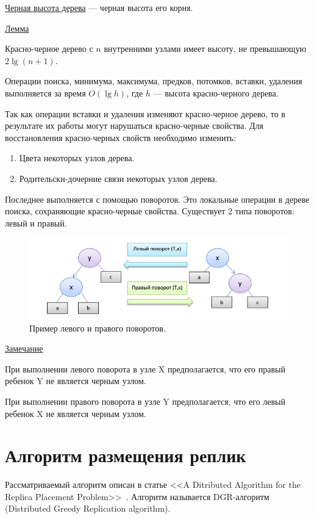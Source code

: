 		\underline{Черная высота дерева} --- черная высота его корня.

		\underline{Лемма}

		Красно-черное дерево с $n$ внутренними узлами имеет высоту, не превышающую 
		$2\lg(n+1)$.
	
		Операции поиска, минимума, максимума, предков, потомков, вставки, удаления выполняется 
		за время $O(\lg h)$, где $h$ --- высота красно-черного дерева.

		Так как операции вставки и удаления изменяют красно-черное дерево,
		то в результате их работы могут нарушаться красно-черные свойства. 
		Для восстановления красно-черных свойств необходимо изменить:
		\begin{enumerate}
			\item Цвета некоторых узлов дерева.
			\item Родительски-дочерние связи некоторых узлов дерева.
		\end{enumerate}
		
		Последнее выполняется с помощью поворотов. Это локальные операции в
		дереве поиска, сохраняющие красно-черные свойства.
		Существует 2 типа поворотов: левый и правый.
		
		\begin{figure}[H]
			\centering
			\includegraphics[width=\textwidth]{img/shift.png}
			\caption{Пример левого и правого поворотов.}
		\end{figure}

		\underline{Замечание}

		При выполнении левого поворота в узле X предполагается, что
		его правый ребенок Y не является черным узлом.
	
		При выполнении правого поворота в узле Y предполагается, что
		его левый ребенок X не является черным узлом.

	\section{Алгоритм размещения реплик}	
		Рассматриваемый алгоритм описан в статье <<A Ditributed Algorithm for the Replica Placement Problem>>~\cite{DGR}.
		Алгоритм называется DGR-алгоритм (Distributed Greedy Replication algorithm).

